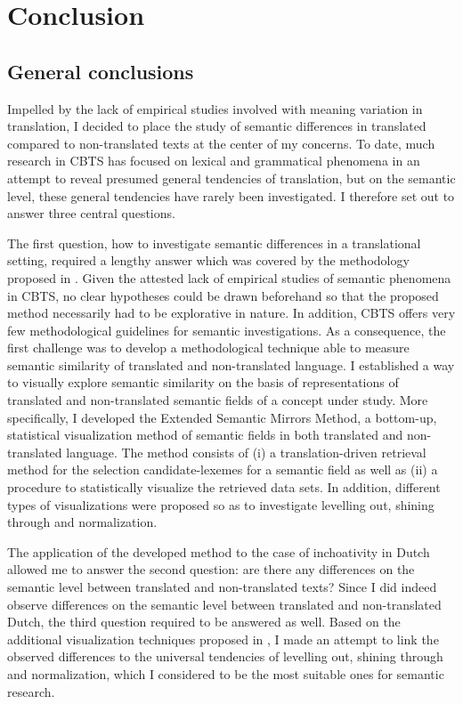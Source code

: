 \chapter{Conclusion}
\label{sec:6}
\section{General conclusions}
\label{sec:6.1}  
Impelled by the lack of empirical studies involved with meaning variation in translation, I decided to place the study of semantic differences in translated compared to non-translated texts at the center of my concerns. To date, much research in CBTS has focused on lexical and grammatical phenomena in an attempt to reveal presumed general tendencies of translation, but on the semantic level, these general tendencies have rarely been investigated. I therefore set out to answer three central questions.

The first question, how to investigate semantic differences in a translational setting, required a lengthy answer which was covered by the methodology proposed in . Given the attested lack of empirical studies of semantic phenomena in CBTS, no clear hypotheses could be drawn beforehand so that the proposed method necessarily had to be explorative in nature. In addition, CBTS offers very few methodological guidelines for semantic investigations. As a consequence, the first challenge was to develop a methodological technique able to measure semantic similarity of translated and non-translated language. I established a way to visually explore semantic similarity on the basis of representations of translated and non-translated semantic fields of a concept under study. More specifically, I developed the Extended Semantic Mirrors Method, a bottom-up, statistical visualization method of semantic fields in both translated and non-translated language. The method consists of (i) a translation-driven retrieval method for the selection candidate-lexemes for a semantic field as well as (ii) a procedure to statistically visualize the retrieved data sets. In addition, different types of visualizations were proposed so as to investigate levelling out, shining through and normalization.

The application of the developed method to the case of inchoativity in Dutch allowed me to answer the second question: are there any differences on the semantic level between translated and non-translated texts? Since I did indeed observe differences on the semantic level between translated and non-translated Dutch, the third question required to be answered as well. Based on the additional visualization techniques proposed in , I made an attempt to link the observed differences to the universal tendencies of levelling out, shining through and normalization, which I considered to be the most suitable ones for semantic research.

